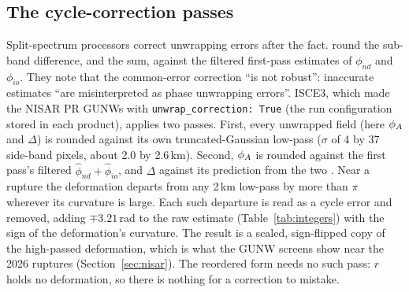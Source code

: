 \subsection{The cycle-correction passes}
\label{sec:corrections}
Split-spectrum processors correct unwrapping errors after the fact. \citet[eqs.~28--29]{gomba2016toward} round the
sub-band difference, and the sum, against the filtered first-pass estimates of $\phi_{nd}$ and $\phi_{io}$. They
note that the common-error correction ``is not robust'': inaccurate estimates ``are misinterpreted as phase unwrapping
errors''. ISCE3, which made the NISAR PR GUNWs with \texttt{unwrap\_correction: True} (the run configuration stored
in each product), applies two passes. First, every unwrapped field (here $\phi_A$ and $\Delta$) is rounded against
its own truncated-Gaussian low-pass ($\sigma$ of 4 by 37 side-band pixels, about 2.0 by 2.6\,km). Second, $\phi_A$ is
rounded against the first pass's filtered $\hat\phi_{nd}+\hat\phi_{io}$, and $\Delta$ against its prediction from
the two \citep{isce3}. Near a rupture the deformation departs from any 2\,km low-pass by more than $\pi$ wherever its
curvature is large. Each such departure is read as a cycle error and removed, adding $\mp 3.21$\,rad to the raw
estimate (Table~\ref{tab:integers}) with the sign of the deformation's curvature. The result is a scaled,
sign-flipped copy of the high-passed deformation, which is what the GUNW screens show near the 2026 ruptures
(Section~\ref{sec:nisar}). The reordered form needs no such pass: $r$ holds no deformation, so there is nothing for
a correction to mistake.

